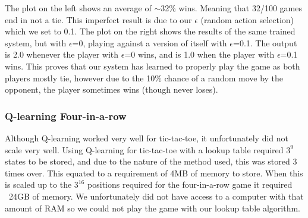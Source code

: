 \documentclass[12pt,a4paper]{article}
\begin{document}
The plot on the left shows an average of $\sim$32\% wins. Meaning that 32/100 games end in not a tie. This imperfect result is due to our $\epsilon$ (random action selection) which we set to 0.1. The plot on the right shows the results of the same trained system, but with $\epsilon$=0, playing against a version of itself with $\epsilon$=0.1.
The output is 2.0 whenever the player with $\epsilon$=0 wins, and is 1.0 when the player with $\epsilon$=0.1 wins. This proves that our system has learned to properly play the game as both players mostly tie, however due to the 10\% chance of a random move by the opponent, the player sometimes wins (though never loses).
\subsubsection*{Q-learning Four-in-a-row}
Although Q-learning worked very well for tic-tac-toe, it unfortunately did not scale very well. Using Q-learning for tic-tac-toe with a lookup table required $3^{9}$ states to be stored, and due to the nature of the method used, this was stored 3 times over. This equated to a requirement of 4MB of memory to store. When this is scaled up to the $3^{16}$ positions required for the four-in-a-row game it required ~24GB of memory. We unfortunately did not have access to a computer with that amount of RAM so we could not play the game with our lookup table algorithm.
\end{document}
